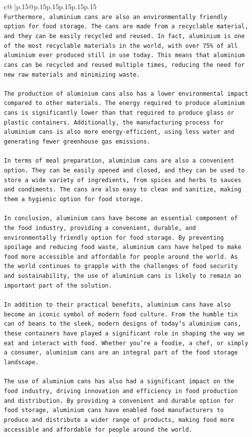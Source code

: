 \documentclass{article}
\begin{document}
{\begin{supertabular}{c@{$\;$}|p{.15\linewidth}@{}p{.15\linewidth}p{.15\linewidth}p{.15\linewidth}p{.15\linewidth}p{.15\linewidth}}
{{{\\ 
\texttt{Furthermore, aluminium cans are also an environmentally friendly option for food storage. The cans are made from a recyclable material, and they can be easily recycled and reused. In fact, aluminium is one of the most recyclable materials in the world, with over 75\% of all aluminium ever produced still in use today. This means that aluminium cans can be recycled and reused multiple times, reducing the need for new raw materials and minimizing waste.} \\
\\ 
\texttt{The production of aluminium cans also has a lower environmental impact compared to other materials. The energy required to produce aluminium cans is significantly lower than that required to produce glass or plastic containers. Additionally, the manufacturing process for aluminium cans is also more energy{-}efficient, using less water and generating fewer greenhouse gas emissions.} \\
\\ 
\texttt{In terms of meal preparation, aluminium cans are also a convenient option. They can be easily opened and closed, and they can be used to store a wide variety of ingredients, from spices and herbs to sauces and condiments. The cans are also easy to clean and sanitize, making them a hygienic option for food storage.} \\
\\ 
\texttt{In conclusion, aluminium cans have become an essential component of the food industry, providing a convenient, durable, and environmentally friendly option for food storage. By preventing spoilage and reducing food waste, aluminium cans have helped to make food more accessible and affordable for people around the world. As the world continues to grapple with the challenges of food security and sustainability, the use of aluminium cans is likely to remain an important part of the solution.} \\
\\ 
\texttt{In addition to their practical benefits, aluminium cans have also become an iconic symbol of modern food culture. From the humble tin can of beans to the sleek, modern designs of today's aluminium cans, these containers have played a significant role in shaping the way we eat and interact with food. Whether you're a foodie, a chef, or simply a consumer, aluminium cans are an integral part of the food storage landscape.} \\
\\ 
\texttt{The use of aluminium cans has also had a significant impact on the food industry, driving innovation and efficiency in food production and distribution. By providing a convenient and durable option for food storage, aluminium cans have enabled food manufacturers to produce and distribute a wider range of products, making food more accessible and affordable for people around the world.} \\
}}}
\end{supertabular}}
\end{document}
